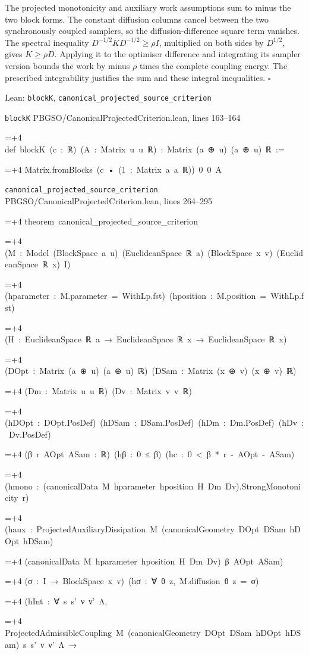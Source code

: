 \documentclass[11pt,a4paper]{report}
\newlength{\leancharwidth}
\newenvironment{leancode}{\par\smallskip\begingroup\ttfamily\footnotesize\raggedright
  \settowidth{\leancharwidth}{M}\setlength{\parskip}{0pt}\setlength{\parindent}{0pt}
  \frenchspacing}{\par\endgroup\smallskip}
\newcommand{\leanline}[2]{\hangindent=\dimexpr#1\leancharwidth+4\leancharwidth\relax
  \hangafter=1\noindent\hspace*{#1\leancharwidth}#2\par}
\newcommand{\leansource}[1]{\par{\footnotesize\color{leanmuted}#1}\par}
\begin{document}
The projected monotonicity and auxiliary work assumptions sum to minus the two block forms. The constant diffusion columns cancel between the two synchronously coupled samplers, so the diffusion-difference square term vanishes. The spectral inequality \(D^{-1/2}KD^{-1/2}\ge\rho I\), multiplied on both sides by \(D^{1/2}\), gives \(K\ge\rho D\). Applying it to the optimiser difference and integrating its sampler version bounds the work by minus \(\rho\) times the complete coupling energy. The prescribed integrability justifies the sum and these integral inequalities. \(\square\)

\begin{leanbox}{Lean: \texttt{blockK}, \texttt{canonical\_\allowbreak{}projected\_\allowbreak{}source\_\allowbreak{}criterion}}
\leansource{\texttt{blockK} \quad PBGSO/\allowbreak{}CanonicalProjectedCriterion.lean, lines 163–164}
\begin{leancode}
\leanline{0}{def\ blockK\ (c\ :\ ℝ)\ (A\ :\ Matrix\ u\ u\ ℝ)\ :\ Matrix\ (a\ ⊕\ u)\ (a\ ⊕\ u)\ ℝ\ :=}
\leanline{2}{Matrix.fromBlocks\ (c\ •\ (1\ :\ Matrix\ a\ a\ ℝ))\ 0\ 0\ A}
\end{leancode}
\leansource{\texttt{canonical\_\allowbreak{}projected\_\allowbreak{}source\_\allowbreak{}criterion} \quad PBGSO/\allowbreak{}CanonicalProjectedCriterion.lean, lines 264–295}
\begin{leancode}
\leanline{0}{theorem\ canonical\_projected\_source\_criterion}
\leanline{4}{(M\ :\ Model\ (BlockSpace\ a\ u)\ (EuclideanSpace\ ℝ\ a)\ (BlockSpace\ x\ v)\ (EuclideanSpace\ ℝ\ x)\ I)}
\leanline{4}{(hparameter\ :\ M.parameter\ =\ WithLp.fst)\ (hposition\ :\ M.position\ =\ WithLp.fst)}
\leanline{4}{(H\ :\ EuclideanSpace\ ℝ\ a\ →\ EuclideanSpace\ ℝ\ x\ →\ EuclideanSpace\ ℝ\ x)}
\leanline{4}{(DOpt\ :\ Matrix\ (a\ ⊕\ u)\ (a\ ⊕\ u)\ ℝ)\ (DSam\ :\ Matrix\ (x\ ⊕\ v)\ (x\ ⊕\ v)\ ℝ)}
\leanline{4}{(Dm\ :\ Matrix\ u\ u\ ℝ)\ (Dv\ :\ Matrix\ v\ v\ ℝ)}
\leanline{4}{(hDOpt\ :\ DOpt.PosDef)\ (hDSam\ :\ DSam.PosDef)\ (hDm\ :\ Dm.PosDef)\ (hDv\ :\ Dv.PosDef)}
\leanline{4}{(β\ r\ AOpt\ ASam\ :\ ℝ)\ (hβ\ :\ 0\ ≤\ β)\ (hc\ :\ 0\ <\ β\ *\ r\ -\ AOpt\ -\ ASam)}
\leanline{4}{(hmono\ :\ (canonicalData\ M\ hparameter\ hposition\ H\ Dm\ Dv).StrongMonotonicity\ r)}
\leanline{4}{(haux\ :\ ProjectedAuxiliaryDissipation\ M\ (canonicalGeometry\ DOpt\ DSam\ hDOpt\ hDSam)}
\leanline{6}{(canonicalData\ M\ hparameter\ hposition\ H\ Dm\ Dv)\ β\ AOpt\ ASam)}
\leanline{4}{(σ\ :\ I\ →\ BlockSpace\ x\ v)\ (hσ\ :\ ∀\ θ\ z,\ M.diffusion\ θ\ z\ =\ σ)}
\leanline{4}{(hInt\ :\ ∀\ s\ s'\ ν\ ν'\ Λ,}
\leanline{6}{ProjectedAdmissibleCoupling\ M\ (canonicalGeometry\ DOpt\ DSam\ hDOpt\ hDSam)\ s\ s'\ ν\ ν'\ Λ\ →}

\end{leancode}
\end{leanbox}
\end{document}
